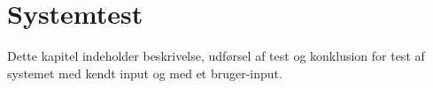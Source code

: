 \chapter{Systemtest}
Dette kapitel indeholder beskrivelse, udførsel af test og konklusion for test af systemet med kendt input og med et bruger-input. 


